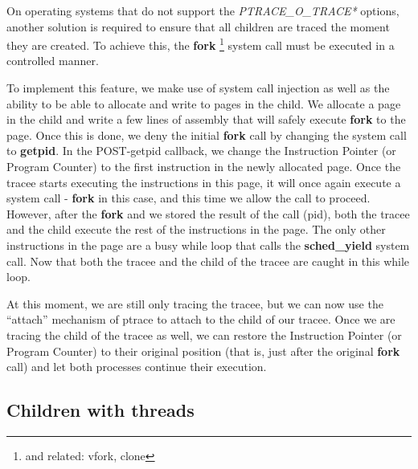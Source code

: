 \documentclass[a4paper, 10pt]{report}
\begin{document}
On operating systems that do not support the \textit{PTRACE\_O\_TRACE*} options,
another solution is required to ensure that all children are traced the moment
they are created. To achieve this, the \textbf{fork}
\footnote{and related: vfork, clone} system call must be executed in a
controlled manner.

To implement this feature, we make use of system call injection as well as the
ability to be able to allocate and write to pages in the child. We allocate a
page in the child and write a few lines of assembly that will safely execute
\textbf{fork} to the page. Once this is done, we deny the initial
\textbf{fork} call by changing the system call to \textbf{getpid}.
In the POST-getpid callback, we change the Instruction Pointer
(or Program Counter) to the first instruction in the newly allocated page.
Once the tracee starts executing the instructions in this
page, it will once again execute a system call - \textbf{fork} in this case,
and this time we allow the call to proceed. However, after the \textbf{fork}
and we stored the result of the call (pid), both the tracee and the child
execute the rest of the instructions in the page. The only other instructions
in the page are a busy while loop that calls the \textbf{sched\_yield}
system call. Now that both the tracee and the child of the tracee are caught
in this while loop.

At this moment, we are still only tracing the tracee, but we can now use the
``attach'' mechanism of ptrace to attach to the child of our tracee. Once we are
tracing the child of the tracee as well, we can restore the Instruction Pointer
(or Program Counter) to their original position (that is, just after the
original \textbf{fork} call) and let both processes continue their execution.



%

\subsection{Children with threads}




\end{document}
